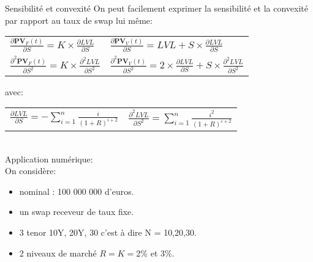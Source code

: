 \documentclass{beamer}
\begin{document}
\begin{frame}{Sensibilité et convexité}
On peut facilement exprimer la sensibilité et la convexité par rapport au taux de swap lui même:\\
\begin{center}
\begin{tabular}{ l l}
$\frac{\partial \textbf{PV}_F(t)}{\partial S}=K \times \frac{\partial LVL}{\partial S} $&
$\frac{\partial \textbf{PV}_V(t)}{\partial S}=LVL+S \times \frac{\partial LVL}{\partial S} $\\
$\frac{\partial^2 \textbf{PV}_F(t)}{\partial S^2}=K \times \frac{\partial^2 LVL}{\partial S^2} $&
$\frac{\partial^2 \textbf{PV}_V(t)}{\partial S^2}=2 \times \frac{\partial LVL}{\partial S} + S \times \frac{\partial^2 LVL}{\partial S^2}$\\
\end{tabular}
\end{center}
avec:\\
\vspace{0.5cm}
\begin{tabular}{c c}
$\frac{\partial LVL}{\partial S}=-\sum_{i=1}^{n} \frac{i}{(1+R)^{i+2}}$&
$\frac{\partial^2 LVL}{\partial S^2}=\sum_{i=1}^{n} \frac{i^2}{(1+R)^{i+2}}$
\end{tabular}\\
\vspace{0.5cm}
Application numérique:\\
On considère:
\begin{itemize}
\item nominal : 100 000 000 d'euros.\\
\item un swap receveur de taux fixe.
\item 3 tenor 10Y, 20Y, 30 c'est à dire N = 10,20,30.
\item 2 niveaux de marché $R=K=$2\% et 3\%.
\end{itemize}
\end{frame}
\end{document}
